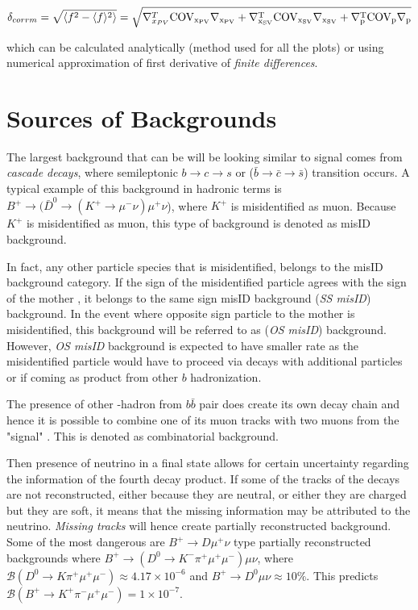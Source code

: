 \begin{equation}
\begin{aligned}
	\delta_{corrm} = \sqrt{ \langle f^{2}-\langle f \rangle^{2} \rangle} = \sqrt{\nabla^{T}_{x_{PV}} \rm{COV_{x_{PV}}} \nabla_{x_{PV}} + \nabla^{T}_{x_{SV}} \rm{COV_{x_{SV}}} \nabla_{x_{SV}} + \nabla^{T}_{p} \rm{COV_{p}} \nabla_{p}} 
\end{aligned}
\end{equation}

which can be calculated analytically (method used for all the plots) or using numerical approximation of first derivative of \textit{finite differences}.

\section{Sources of Backgrounds }
The largest background that can be will be looking similar to signal comes from \textit{cascade decays}, where semileptonic $b \rightarrow c \rightarrow s$ or ($\bar{b} \rightarrow \bar{c} \rightarrow \bar{s}$) transition occurs. A typical example of this background in hadronic terms is $B^{+} \rightarrow (\bar{D}^{0} \rightarrow (K^{+} \rightarrow \mu^{-} \nu) \mu^{+} \nu$), where $K^{+}$ is misidentified as muon. Because $K^{+}$ is misidentified as muon, this type of background is denoted as misID background.

In fact, any other particle species that is misidentified, belongs to the misID background category. If the sign of the misidentified particle agrees with the sign of the mother \Bpm, it belongs to the same sign misID background (\textit{SS misID}) background. In the event where opposite sign particle to the mother \Bpm is misidentified, this background will be referred to as (\textit{OS misID}) background. However, \textit{OS misID} background is expected to have smaller rate as the misidentified particle would have to proceed via decays with additional particles or if coming as product from other $b$ hadronization.

The presence of other \B-hadron from $b\bar{b}$ pair does create its own decay chain and hence it is possible to combine one of its muon tracks with two muons from the "signal" \B. This is denoted as combinatorial background.

Then presence of neutrino in a final state allows for certain uncertainty regarding the information of the fourth decay product. If some of the tracks of the decays are not reconstructed, either because they are neutral, or either they are charged but they are soft, it means that the missing information may be attributed to the neutrino. \textit{Missing tracks} will hence create partially reconstructed background. Some of the most dangerous are ${B^{+} \rightarrow D \mu^{+} \nu}$ type partially reconstructed backgrounds where $B^+ \rightarrow (D^0 \rightarrow K^- \pi^+ \mu^{+} \mu^{-})\mu \nu$, where $\mathcal{B}(D^0 \rightarrow K \pi^+ \mu^{+} \mu^{-}) \approx 4.17\times 10^{-6}$ and $B^{+} \rightarrow D^0 \mu \nu \approx 10 \%$. This predicts $\mathcal{B}(B^+ \rightarrow K^+ \pi^- \mu^+ \mu^{-} ) = 1\times10^{-7}$.

